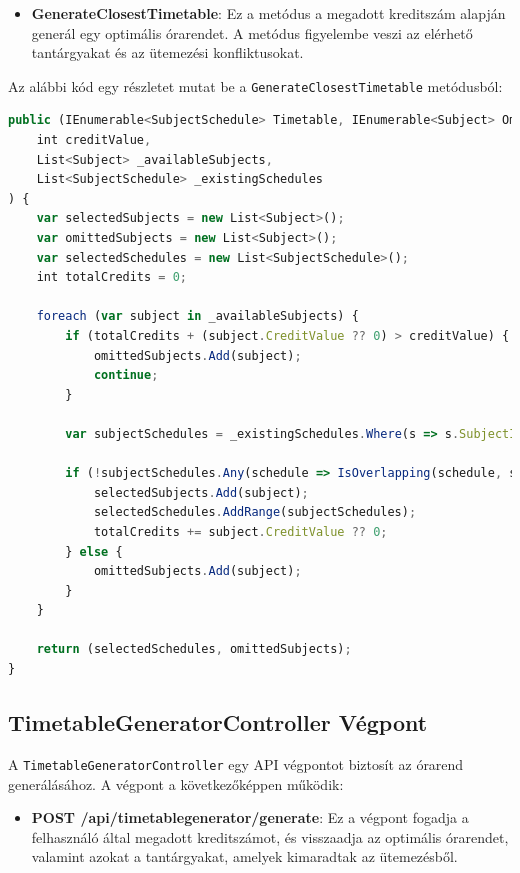 \documentclass[colorlinks]{thesis-kando}
\theoremstyle{definition}
\theoremstyle{remark}
\begin{document}
\begin{itemize}
    \item \textbf{GenerateClosestTimetable}: Ez a metódus a megadott kreditszám alapján generál egy optimális órarendet. A metódus figyelembe veszi az elérhető tantárgyakat és az ütemezési konfliktusokat.
\end{itemize}

Az alábbi kód egy részletet mutat be a \texttt{GenerateClosestTimetable} metódusból:

\begin{lstlisting}[language=JavaScript]
public (IEnumerable<SubjectSchedule> Timetable, IEnumerable<Subject> OmittedSubjects) GenerateClosestTimetable(
    int creditValue,
    List<Subject> _availableSubjects,
    List<SubjectSchedule> _existingSchedules
) {
    var selectedSubjects = new List<Subject>();
    var omittedSubjects = new List<Subject>();
    var selectedSchedules = new List<SubjectSchedule>();
    int totalCredits = 0;

    foreach (var subject in _availableSubjects) {
        if (totalCredits + (subject.CreditValue ?? 0) > creditValue) {
            omittedSubjects.Add(subject);
            continue;
        }

        var subjectSchedules = _existingSchedules.Where(s => s.SubjectId == subject.Id).ToList();

        if (!subjectSchedules.Any(schedule => IsOverlapping(schedule, selectedSchedules))) {
            selectedSubjects.Add(subject);
            selectedSchedules.AddRange(subjectSchedules);
            totalCredits += subject.CreditValue ?? 0;
        } else {
            omittedSubjects.Add(subject);
        }
    }

    return (selectedSchedules, omittedSubjects);
}
\end{lstlisting}

\subsection{TimetableGeneratorController Végpont}
A \texttt{TimetableGeneratorController} egy API végpontot biztosít az órarend generálásához. A végpont a következőképpen működik:

\begin{itemize}
    \item \textbf{POST /api/timetablegenerator/generate}: Ez a végpont fogadja a felhasználó által megadott kreditszámot, és visszaadja az optimális órarendet, valamint azokat a tantárgyakat, amelyek kimaradtak az ütemezésből.
\end{itemize}
\end{document}

